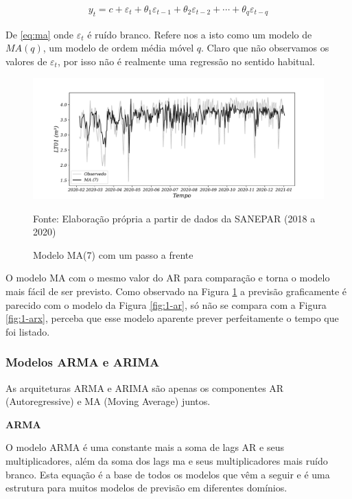 \begin{eqnarray}
	y_t=c+\varepsilon_t+\theta_1 \varepsilon_{t-1}+\theta_2 \varepsilon_{t-2}+\cdots+\theta_q \varepsilon_{t-q}\label{eq:ma}
\end{eqnarray}

De \eqref{eq:ma} onde $\varepsilon_t$ é ruído branco. Refere nos a isto como um modelo de $MA(q)$, um modelo de ordem média móvel $q$. Claro que não observamos os valores de $\varepsilon_t$, por isso não é realmente uma regressão no sentido habitual.

\begin{figure}[H]
	\centering
	\caption{Modelo MA(7) com um passo a frente}
	\label{fig:1-ma}
	\includegraphics[width=1\linewidth]{Modelos/Figuras/1-MA}
	
	Fonte: Elaboração própria a partir de dados da SANEPAR (2018 a 2020)
\end{figure}

O modelo MA com o mesmo valor do AR para comparação e torna o modelo mais fácil de ser previsto. Como observado na Figura \ref{fig:1-ma} a previsão graficamente é parecido com o modelo da Figura \ref{fig:1-ar}, só não se compara com a Figura \ref{fig:1-arx}, perceba que esse modelo aparente prever perfeitamente o tempo que foi listado.  

\subsubsection{Modelos ARMA e ARIMA}\label{subsubsec:arma}
As arquiteturas ARMA e ARIMA são apenas os componentes AR (Autoregressive) e MA (Moving Average) juntos.

\textbf{ARMA}

O modelo ARMA é uma constante mais a soma de lags AR e seus multiplicadores, além da soma dos lags ma e seus multiplicadores mais ruído branco. Esta equação é a base de todos os modelos que vêm a seguir e é uma estrutura para muitos modelos de previsão em diferentes domínios.

